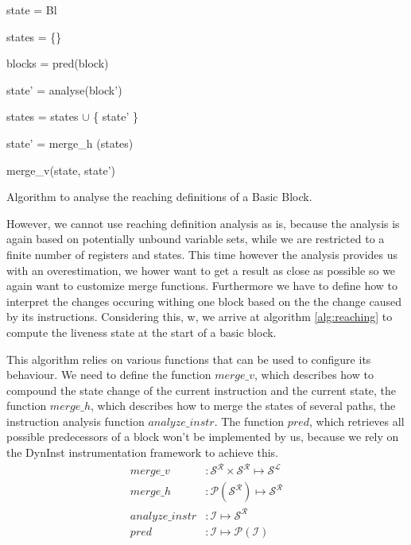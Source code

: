 \begin{algorithm}[!h]
	\SetAlgoLined
	{
 	state = Bl
 	

	states = \{\}
	
	blocks = pred(block)
	
	 {
	
 		state' = analyse(block')
 		
		states = states $\cup$ \{ state' \}
	}

	state' = merge\_h (states)

	\Return merge\_v(state, state')

	}
\caption{Algorithm to analyse the reaching definitions of a Basic Block.}
\label{alg:reaching}
\end{algorithm}

However, we cannot use reaching definition analysis as is, because the analysis is again based on potentially unbound variable sets, while we are restricted to a finite number of registers and states. This time however the analysis provides us with an overestimation, we hower want to get a result as close as possible so we again want to customize merge functions. Furthermore we have to define how to interpret the changes occuring withing one block based on the the change caused by its instructions. Considering this, w, we arrive at algorithm \ref{alg:reaching} to compute the liveness state at the start of a basic block.

This algorithm relies on various functions that can be used to configure its behaviour. We need to define the function $merge\_v$, which describes how to compound the state change of the current instruction and the current state, the function $merge\_h$, which describes how to merge the states of several paths, the instruction analysis function $analyze\_instr$. The function $pred$, which retrieves all possible predecessors of a block won't be implemented by us, because we rely on the DynInst instrumentation framework to achieve this.
\begin{subequations}
\label{eq:livenesscustom}
\begin{align}
merge\_v &: \mathcal{S}^\mathcal{R} \times \mathcal{S}^\mathcal{R} \mapsto \mathcal{S}^\mathcal{L}\\
merge\_h &: \mathcal{P}(\mathcal{S}^\mathcal{R}) \mapsto \mathcal{S}^\mathcal{R}\\
analyze\_instr &: \mathcal {I} \mapsto \mathcal{S}^\mathcal{R} \\
pred &: \mathcal{I} \mapsto \mathcal{P}(\mathcal{I})
\end{align}
\end{subequations}

